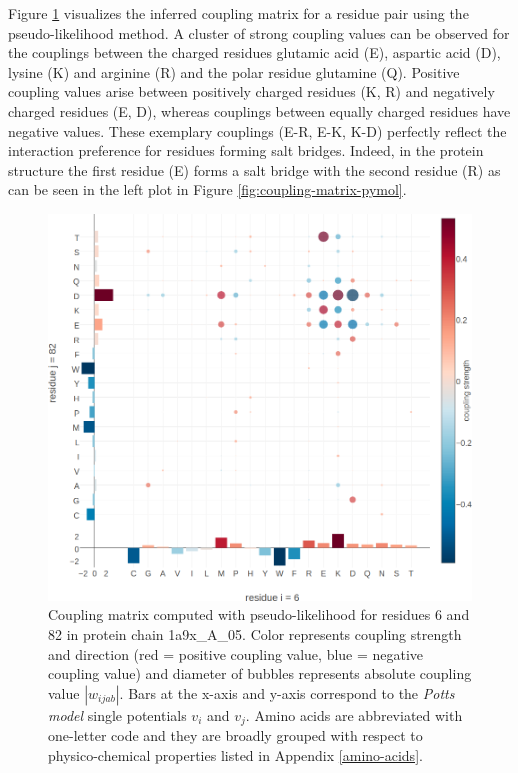 \documentclass[12pt,a4paper,twoside]{book}
\newcommand{\vi}{v_{i}}
\newcommand{\vj}{v_{j}}
\newcommand{\wijab}{w_{ijab}}
\theoremstyle{definition}
\theoremstyle{definition}
\theoremstyle{remark}
\begin{document}
Figure \ref{fig:coupling-matrix-ionic-interaction} visualizes the
inferred coupling matrix for a residue pair using the pseudo-likelihood
method. A cluster of strong coupling values can be observed for the
couplings between the charged residues glutamic acid (E), aspartic acid
(D), lysine (K) and arginine (R) and the polar residue glutamine (Q).
Positive coupling values arise between positively charged residues (K,
R) and negatively charged residues (E, D), whereas couplings between
equally charged residues have negative values. These exemplary couplings
(E-R, E-K, K-D) perfectly reflect the interaction preference for
residues forming salt bridges. Indeed, in the protein structure the
first residue (E) forms a salt bridge with the second residue (R) as can
be seen in the left plot in Figure \ref{fig:coupling-matrix-pymol}.











\begin{figure}
\includegraphics[width=0.9\linewidth]{img/coupling_matrix_analysis/coupling_matrix_1a9xA05_6_82_notitle} \caption{Coupling matrix computed
with pseudo-likelihood for residues 6 and 82 in protein chain
1a9x\_A\_05. Color represents coupling strength and direction (red =
positive coupling value, blue = negative coupling value) and diameter of
bubbles represents absolute coupling value \(|\wijab|\). Bars at the
x-axis and y-axis correspond to the \emph{Potts model} single potentials
\(\vi\) and \(\vj\). Amino acids are abbreviated with one-letter code
and they are broadly grouped with respect to physico-chemical properties
listed in Appendix \ref{amino-acids}.}\label{fig:coupling-matrix-ionic-interaction}
\end{figure}
\end{document}

